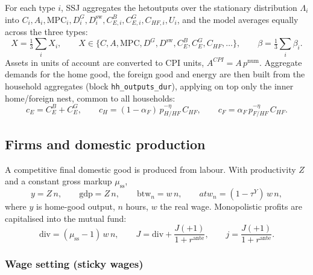 \documentclass[11pt,a4paper]{article}
\newcommand{\num}{\mathrm{num}}
\newcommand{\stst}{\mathrm{ss}}
\newcommand{\dsw}{D^{\mathrm{sw}}}
\newcommand{\DG}{D^{G}}
\begin{document}
For each type $i$, SSJ aggregates the hetoutputs over the stationary
distribution $\Lambda_i$ into $C_i,A_i,\mathrm{MPC}_i,\DG_i,\dsw_i,
C^{B}_{E,i},C^{G}_{E,i},C_{HF,i},U_i$, and the model averages equally across the
three types:
\begin{equation}
X=\tfrac13\textstyle\sum_i X_i,\qquad
X\in\{C,A,\mathrm{MPC},\DG,\dsw,C^{B}_{E},C^{G}_{E},C_{HF},\ldots\},
\qquad \beta=\tfrac13\textstyle\sum_i\beta_i .
\end{equation}
Assets in units of account are converted to CPI units, $A^{CPI}=A\,p^{\num}$.
Aggregate demands for the home good, the foreign good and energy are then built
from the household aggregates (block \texttt{hh\_outputs\_dur}), applying on top
only the inner home/foreign nest, common to all households:
\begin{equation}
c_E = C^{B}_{E}+C^{G}_{E},\qquad
c_H = (1-\alpha_F)\,p_{H/HF}^{-\eta}\,C_{HF},\qquad
c_F = \alpha_F\,p_{F/HF}^{-\eta}\,C_{HF}. \label{eq:cHcF}
\end{equation}

\subsection{Firms and domestic production}\label{sec:firms}

A competitive final domestic good is produced from labour. With productivity $Z$
and a constant gross markup $\mu_{\stst}$,
\begin{equation}
y = Z\,n,\qquad
\mathrm{gdp}=Z\,n,\qquad
\text{btw}_n = w\,n,\qquad
atw_n = (1-\tau^{Y})\,w\,n,
\end{equation}
where $y$ is home-good output, $n$ hours, $w$ the real wage. Monopolistic
profits are capitalised into the mutual fund:
\begin{equation}
\mathrm{div}=(\mu_{\stst}-1)\,w\,n,\qquad
J=\mathrm{div}+\frac{J(+1)}{1+r^{\text{ante}}},\qquad
j=\frac{J(+1)}{1+r^{\text{ante}}}.
\end{equation}

\subsubsection{Wage setting (sticky wages)}\label{sec:union}
\end{document}
